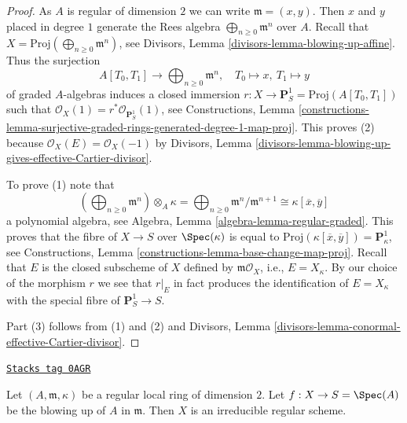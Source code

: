 \begin{proof}
As $A$ is regular of dimension $2$ we can write $\mathfrak m = (x, y)$.
Then $x$ and $y$ placed in degree $1$ generate the Rees algebra
$\bigoplus_{n \geq 0} \mathfrak m^n$ over $A$. Recall that
$X = \text{Proj}(\bigoplus_{n \geq 0} \mathfrak m^n)$, see
Divisors, Lemma \ref{divisors-lemma-blowing-up-affine}.
Thus the surjection
$$
A[T_0, T_1] \longrightarrow \bigoplus\nolimits_{n \geq 0} \mathfrak m^n,
\quad
T_0 \mapsto x,\ T_1 \mapsto y
$$
of graded $A$-algebras induces a closed immersion
$r : X \to \mathbf{P}^1_S = \text{Proj}(A[T_0, T_1])$
such that $\mathcal{O}_X(1) = r^*\mathcal{O}_{\mathbf{P}^1_S}(1)$, see
Constructions, Lemma
\ref{constructions-lemma-surjective-graded-rings-generated-degree-1-map-proj}.
This proves (2) because $\mathcal{O}_X(E) = \mathcal{O}_X(-1)$
by Divisors, Lemma
\ref{divisors-lemma-blowing-up-gives-effective-Cartier-divisor}.

\medskip\noindent
To prove (1) note that
$$
\left(\bigoplus\nolimits_{n \geq 0} \mathfrak m^n\right) \otimes_A \kappa =
\bigoplus\nolimits_{n \geq 0} \mathfrak m^n/\mathfrak m^{n + 1} \cong
\kappa[\overline{x}, \overline{y}]
$$
a polynomial algebra, see Algebra, Lemma \ref{algebra-lemma-regular-graded}.
This proves that the fibre of $X \to S$ over $\Spec(\kappa)$ is equal to
$\text{Proj}(\kappa[\overline{x}, \overline{y}]) = \mathbf{P}^1_\kappa$, see
Constructions, Lemma \ref{constructions-lemma-base-change-map-proj}.
Recall that $E$ is the closed subscheme of $X$ defined by
$\mathfrak m\mathcal{O}_X$, i.e., $E = X_\kappa$.
By our choice of the morphism $r$ we see that $r|_E$ in fact
produces the identification of $E = X_\kappa$ with the special
fibre of $\mathbf{P}^1_S \to S$.

\medskip\noindent
Part (3) follows from (1) and (2) and Divisors, Lemma
\ref{divisors-lemma-conormal-effective-Cartier-divisor}.
\end{proof}

\begin{lemma}
\label{resolve-lemma-blowup-regular}
\href{https://stacks.math.columbia.edu/tag/0AGR}{\texttt{Stacks tag 0AGR}}

Let $(A, \mathfrak m, \kappa)$ be a regular local ring of dimension $2$.
Let $f : X \to S = \Spec(A)$ be the blowing up of $A$ in $\mathfrak m$.
Then $X$ is an irreducible regular scheme.
\end{lemma}

